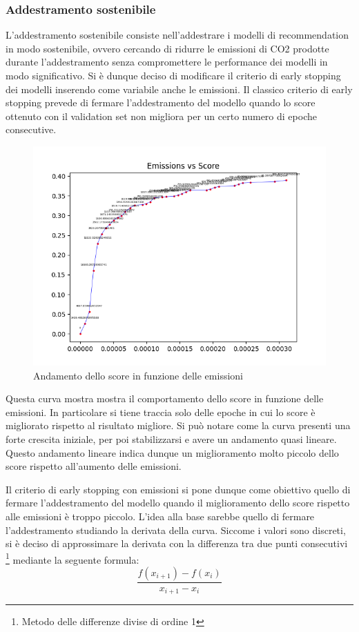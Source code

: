 \subsubsection{Addestramento sostenibile}
L'addestramento sostenibile consiste nell'addestrare i modelli di recommendation in modo sostenibile, ovvero cercando di ridurre le emissioni di CO2 prodotte durante l'addestramento senza compromettere le performance dei modelli in modo significativo.
Si è dunque deciso di modificare il criterio di early stopping dei modelli inserendo come variabile anche le emissioni.
Il classico criterio di early stopping prevede di fermare l'addestramento del modello quando lo score ottenuto con il validation set non migliora per un certo numero di epoche consecutive.


\begin{figure}[H]
    \centering
     \includegraphics[width=\textwidth]{images/curve_emissions_score.png}
    \caption{Andamento dello score in funzione delle emissioni}
\end{figure}

\noindent Questa curva mostra mostra il comportamento dello score in funzione delle emissioni. In particolare si tiene traccia solo delle epoche in cui lo score è migliorato rispetto al risultato migliore.
Si può notare come la curva presenti una forte crescita iniziale, per poi stabilizzarsi e avere un andamento quasi lineare.
Questo andamento lineare indica dunque un miglioramento molto piccolo dello score rispetto all'aumento delle emissioni.

\noindent Il criterio di early stopping con emissioni si pone dunque come obiettivo quello di fermare l'addestramento del modello quando il miglioramento dello score rispetto alle emissioni è troppo piccolo.
L'idea alla base sarebbe quello di fermare l'addestramento studiando la derivata della curva. Siccome i valori sono discreti, si è deciso di approssimare la derivata con la differenza tra due punti consecutivi \footnote{Metodo delle differenze divise di ordine 1}{} mediante la seguente formula:
\begin{equation}
    \frac{f(x_{i+1}) - f(x_i)}{x_{i+1} - x_i}
\end{equation}

